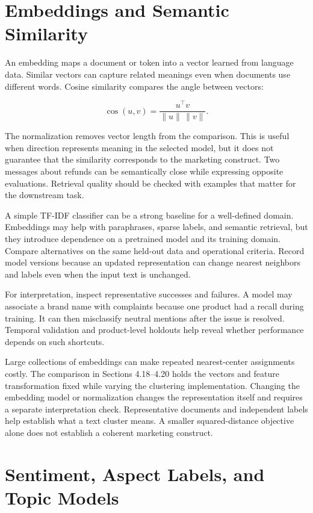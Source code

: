 \hypertarget{M05-embeddings-and-semantic-similarity}{%
\section{Embeddings and Semantic
Similarity}\label{M05-embeddings-and-semantic-similarity}}

\noindent An embedding maps a document or token into a vector learned from
language data. Similar vectors can capture related meanings even when
documents use different words. Cosine similarity compares the angle
between vectors:

\[
\operatorname{cos}(u,v)=\frac{u^\top v}{\|u\|\,\|v\|}.
\]

The normalization removes vector length from the comparison. This is
useful when direction represents meaning in the selected model, but it
does not guarantee that the similarity corresponds to the marketing
construct. Two messages about refunds can be semantically close while
expressing opposite evaluations. Retrieval quality should be checked
with examples that matter for the downstream task.

A simple TF-IDF classifier can be a strong baseline for a well-defined
domain. Embeddings may help with paraphrases, sparse labels, and
semantic retrieval, but they introduce dependence on a pretrained model
and its training domain. Compare alternatives on the same held-out data
and operational criteria. Record model versions because an updated
representation can change nearest neighbors and labels even when the
input text is unchanged.

For interpretation, inspect representative successes and failures. A
model may associate a brand name with complaints because one product had
a recall during training. It can then misclassify neutral mentions after
the issue is resolved. Temporal validation and product-level holdouts
help reveal whether performance depends on such shortcuts.

Large collections of embeddings can make repeated nearest-center
assignments costly. The comparison in Sections 4.18--4.20 holds the
vectors and feature transformation fixed while varying the clustering
implementation. Changing the embedding model or normalization changes
the representation itself and requires a separate interpretation check.
Representative documents and independent labels help establish what a
text cluster means. A smaller squared-distance objective alone does not
establish a coherent marketing construct.

\hypertarget{M05-sentiment-aspect-labels-and-topic-models}{%
\section{Sentiment, Aspect Labels, and Topic
Models}\label{M05-sentiment-aspect-labels-and-topic-models}}

